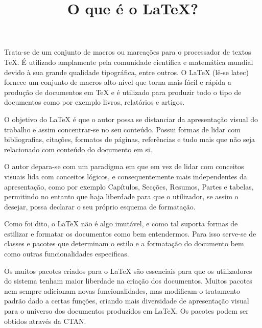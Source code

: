 \documentclass[12pt]{memoir}
\begin{document}
\title {O que é o \LaTeX?}
\date{} %
\maketitle 

Trata-se de um conjunto de macros ou marcações para o processador de textos TeX. É utilizado amplamente pela comunidade científica e matemática mundial devido à sua grande qualidade tipográfica, entre outros. O LaTeX (lê-se latec) fornece um conjunto de macros alto-nível que torna mais fácil e rápida a produção de documentos em TeX e é utilizado para produzir todo o tipo de documentos como por exemplo livros, relatórios e artigos.

O objetivo do LaTeX é que o autor possa se distanciar da apresentação visual do trabalho e assim concentrar-se no seu conteúdo. Possui formas de lidar com bibliografias, citações, formatos de páginas, referências e tudo mais que não seja relacionado com conteúdo do documento em si.

O autor depara-se com um paradigma em que em vez de lidar com conceitos visuais lida com conceitos lógicos, e consequentemente mais independentes da apresentação, como por exemplo Capítulos, Secções, Resumos, Partes e tabelas, permitindo no entanto que haja liberdade para que o utilizador, se assim o desejar, possa declarar o seu próprio esquema de formatação.

Como foi dito, o LaTeX não é algo imutável, e como tal suporta formas de estilizar e formatar os documentos como bem entendermos. Para isso serve-se de classes e pacotes que determinam o estilo e a formatação do documento bem como outras funcionalidades especificas.

Os muitos pacotes criados para o LaTeX são essenciais para que os utilizadores do sistema tenham maior liberdade na criação dos documentos. Muitos pacotes nem sempre adicionam novas funcionalidades, mas modificam o tratamento padrão dado a certas funções, criando mais diversidade de apresentação visual para o universo dos documentos produzidos em LaTeX. Os pacotes podem ser obtidos através da CTAN.
\end{document}
